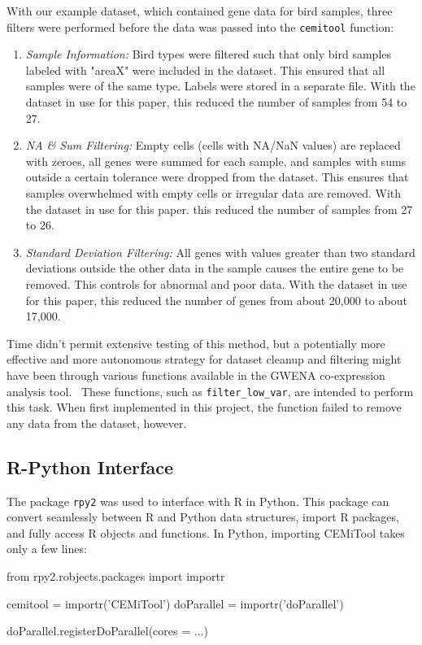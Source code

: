 With our example dataset, which contained gene data for bird samples, three filters were performed before the data was passed into the \texttt{cemitool} function:
\begin{enumerate}
  \item \emph{Sample Information:} Bird types were filtered such that only bird samples labeled with "areaX" were included in the dataset. This ensured that all samples were of the same type. Labels were stored in a separate file. With the dataset in use for this paper, this reduced the number of samples from 54 to 27.
  \item \emph{NA \& Sum Filtering:} Empty cells (cells with NA/NaN values) are replaced with zeroes, all genes were summed for each sample, and samples with sums outside a certain tolerance were dropped from the dataset. This ensures that samples overwhelmed with empty cells or irregular data are removed. With the dataset in use for this paper. this reduced the number of samples from 27 to 26.
  \item \emph{Standard Deviation Filtering:} All genes with values greater than two standard deviations outside the other data in the sample causes the entire gene to be removed. This controls for abnormal and poor data. With the dataset in use for this paper, this reduced the number of genes from about 20,000 to about 17,000. 
\end{enumerate}

Time didn't permit extensive testing of this method, but a potentially more effective and more autonomous strategy for dataset cleanup and filtering might have been through various functions available in the GWENA co-expression analysis tool.~\cite{gwena} These functions, such as \texttt{filter\_low\_var}, are intended to perform this task. When first implemented in this project, the function failed to remove any data from the dataset, however.

\subsection{R-Python Interface}
\label{subsec: interface}
The package \texttt{rpy2} was used to interface with R in Python. This package can convert seamlessly between R and Python data structures, import R packages, and fully access R objects and functions. In Python, importing CEMiTool takes only a few lines:

\begin{example}
  from rpy2.robjects.packages import importr
  
  cemitool = importr('CEMiTool')
  doParallel = importr('doParallel')

  doParallel.registerDoParallel(cores = ...)
\end{example}

